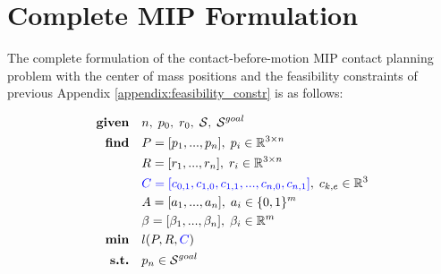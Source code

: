 \section{Complete MIP Formulation \label{appendix:complete_mip_formulation}}
The complete formulation of the contact-before-motion MIP contact planning problem with the center of mass positions and the feasibility constraints of previous Appendix \ref{appendix:feasibility_constr} is as follows:

\begin{align}
    \textrm{\textbf{given}} %
                            \quad & n, \; p_0, \; r_0, \; \mathcal{S}, \; \mathcal{S}^{goal} \nonumber\\
    \textrm{\textbf{find}}  \quad & P=[p_1,...,p_n], \; p_i \in \mathbb{R}^{3 \times n} \nonumber\\
                            \quad & R=[r_1,...,r_n], \; r_i \in \mathbb{R}^{3 \times n} \nonumber\\
                            \quad & \textcolor{blue}{C=[c_{0,1},c_{1,0},c_{1,1},...,c_{n,0},c_{n,1}]}, \; c_{k,e} \in \mathbb{R}^3 \nonumber\\
                            \quad & A=[a_1,...,a_n], \; a_i \in \{0,1\}^{m} \nonumber\\
                            \quad & \beta=[\beta_1,...,\beta_n], \; \beta_i \in \mathbb{R}^{m} \nonumber\\
    \textrm{\textbf{min}}  \quad & l(P,R,\textcolor{blue}{C}) \nonumber\\
    \textrm{\textbf{s.t.}}  \quad & p_n \in \mathcal{S}^{goal} \nonumber\\

\end{align}
